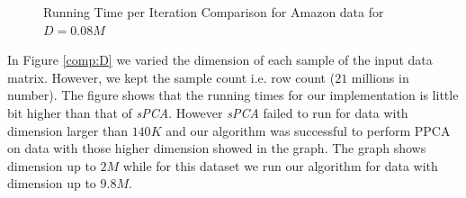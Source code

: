 \documentclass[12pt,notitlepage,oneside]{report}
\begin{document}
\begin{figure}[!htbp]
    \centering
    \caption{Running Time per Iteration Comparison for Amazon data for $D=0.08M$}
    \label{comp:N}
\end{figure}

In Figure \ref{comp:D} we varied the dimension of each sample of the input data matrix. However, we kept the sample count i.e. row count ($21$ millions in number). The figure shows that the running times for our implementation is little bit higher than that of \textit{sPCA}. However \textit{sPCA} failed to run for data with dimension larger than $140K$ and our algorithm was successful to perform PPCA on data with those higher dimension showed in the graph. The graph shows dimension up to $2M$ while for this dataset we run our algorithm for data with dimension up to $9.8M$. 
\end{document}
